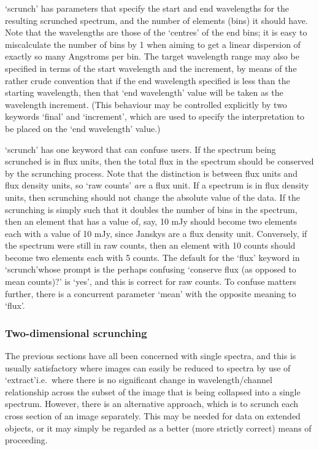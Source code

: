    `scrunch' has parameters that specify the start and end wavelengths
   for the resulting scrunched spectrum, and the number of elements
   (bins) it should have.  Note that the wavelengths are those of the
   `centres' of the end bins; it is easy to miscalculate the number of
   bins by 1 when aiming to get a linear dispersion of exactly so many
   Angstroms per bin.  The target wavelength range may also be specified
   in terms of the start wavelength and the increment, by means of the
   rather crude convention that if the end wavelength specified is less
   than the starting wavelength, then that `end wavelength' value will
   be taken as the wavelength increment.  (This behaviour may be
   controlled explicitly by two keywords `final' and `increment', which
   are used to specify the interpretation to be placed on the `end
   wavelength' value.)

   `scrunch' has one keyword that can confuse users.  If the spectrum
   being scrunched is in flux units, then the total flux in the spectrum
   should be conserved by the scrunching process.  Note that the
   distinction is between flux units and flux density units, so `raw
   counts' {\em are\/}
   a flux unit. If a spectrum is in flux density units, then scrunching
   should not change the absolute value of the data.  If the scrunching
   is simply such that it doubles the number of bins in the spectrum,
   then an element that has a value of, say, 10 mJy should become two
   elements each with a value of 10 mJy, since Janskys are a flux
   density unit.  Conversely, if the spectrum were still in raw counts,
   then an element with 10 counts should become two elements each with 5
   counts.  The default for the `flux' keyword in
   `scrunch'\latorhtm{---}{-}whose
   prompt is the perhaps confusing `conserve flux (as opposed to mean
   counts)?' is `yes', and this is correct for raw counts. To confuse
   matters further, there is a concurrent parameter `mean' with the
   opposite meaning to `flux'.


\subsubsection{\label{techno8iscrunch}Two-dimensional scrunching}

   The previous sections have all been concerned with single spectra,
   and this is usually satisfactory where images can easily be reduced
   to spectra by use of `extract'\latorhtm{---}{-}i.e.\ where there is
   no significant
   change in wavelength/channel relationship across the subset of the
   image that is being collapsed into a single spectrum. However, there
   is an alternative approach, which is to scrunch each cross section of
   an image separately.  This may be needed for data on extended
   objects, or it may simply be regarded as a better (more strictly
   correct) means of proceeding.

